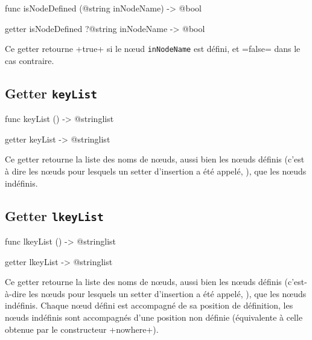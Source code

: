 \begin{galgas4}
func isNodeDefined (@string inNodeName) -> @bool
\end{galgas4}

\begin{galgas3}
getter isNodeDefined ?@string inNodeName -> @bool
\end{galgas3}

Ce getter retourne \ggst+true+ si le nœud \texttt{inNodeName} est défini, et \ggst=false= dans le cas contraire.


\subsection{Getter \texttt{keyList}}

\begin{galgas4}
func keyList () -> @stringlist
\end{galgas4}

\begin{galgas3}
getter keyList -> @stringlist
\end{galgas3}

Ce getter retourne la liste des noms de nœuds, aussi bien les nœuds définis (c'est à dire les nœuds pour lesquels un setter d'insertion a été appelé, ), que les nœuds indéfinis.



\subsection{Getter \texttt{lkeyList}}

\begin{galgas4}
func lkeyList () -> @stringlist
\end{galgas4}

\begin{galgas3}
getter lkeyList -> @stringlist
\end{galgas3}

Ce getter retourne la liste des noms de nœuds, aussi bien les nœuds définis (c'est-à-dire les nœuds pour lesquels un setter d'insertion a été appelé, ), que les nœuds indéfinis. Chaque nœud défini est accompagné de sa position de définition, les nœuds indéfinis sont accompagnés d'une position non définie (équivalente à celle obtenue par le constructeur \ggst+nowhere+).






